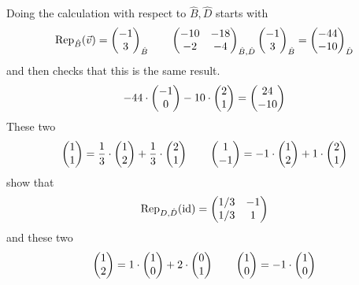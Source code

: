 \begin{exercises}
\begin{answer}
\begin{exparts}
\begin{equation*}
          \end{equation*}
          Doing the calculation with respect to $\hat{B},\hat{D}$ starts with
          \begin{equation*}
            \rep{\vec{v}}{\hat{B}}=\colvec{-1 \\ 3}_{\hat{B}}
            \qquad
            \begin{pmatrix}
              -10  &-18  \\
               -2  &-4
            \end{pmatrix}_{\hat{B},\hat{D}}
            \colvec{-1 \\ 3}_{\hat{B}}
            =\colvec{-44 \\ -10}_{\hat{D}}
          \end{equation*}
          and then checks that this is the same result.
          \begin{equation*}
            -44\cdot\colvec{-1 \\ 0}-10\cdot\colvec{2 \\ 1}=\colvec{24 \\ -10}
          \end{equation*}
    \partsitem These two
      \begin{equation*}
        \colvec{1 \\ 1}=\frac{1}{3}\cdot\colvec{1 \\ 2}
                  +\frac{1}{3}\cdot\colvec{2 \\ 1}
        \qquad
        \colvec{1 \\ -1}=-1\cdot\colvec{1 \\ 2}
                  +1\cdot\colvec{2 \\ 1}
      \end{equation*}
      show that
      \begin{equation*}
        \rep{\identity}{D,\hat{D}}=\begin{pmatrix}
          1/3  &-1  \\
          1/3  &1
        \end{pmatrix}
      \end{equation*}
      and these two
      \begin{equation*}
        \colvec{1 \\ 2}=1\cdot\colvec{1 \\ 0}
                  +2\cdot\colvec{0 \\ 1}
        \qquad
        \colvec{1 \\ 0}=-1\cdot\colvec{1 \\ 0}

\end{equation*}
\end{exparts}
\end{answer}
\end{exercises}

